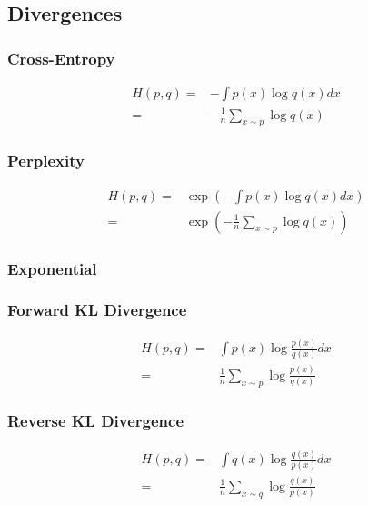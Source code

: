 \subsection{Divergences}

\subsubsection{Cross-Entropy}
\begin{equation}
  \begin{aligned}
    H(p, q) =& - \int p(x) \log q(x) dx \\
    =& - \frac{1}{n} \sum_{x \sim p} \log q(x)
  \end{aligned}
\end{equation}
\subsubsection{Perplexity}
\begin{equation}
  \begin{aligned}
    H(p, q) =& \exp \left( - \int p(x) \log q(x) dx \right) \\
    =& \exp \left(- \frac{1}{n} \sum_{x \sim p} \log q(x) \right)
  \end{aligned}
\end{equation}

\subsubsection{Exponential}

\subsubsection{Forward KL Divergence}
\begin{equation}
  \begin{aligned}
    H(p, q) =& \int p(x) \log \frac{p(x)}{q(x)} dx  \\
    =&  \frac{1}{n} \sum_{x \sim p} \log \frac{p(x)}{q(x)}
  \end{aligned}
\end{equation}
\subsubsection{Reverse KL Divergence}
\begin{equation}
  \begin{aligned}
    H(p, q) =& \int q(x) \log \frac{q(x)}{p(x)} dx  \\
    =&  \frac{1}{n} \sum_{x \sim q} \log \frac{q(x)}{p(x)}
  \end{aligned}
\end{equation}
